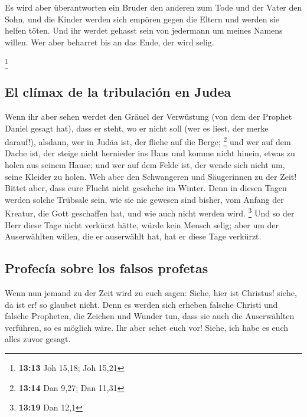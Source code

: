  Es wird aber überantworten ein Bruder den anderen zum
Tode und der Vater den Sohn, und die Kinder werden sich empören gegen
die Eltern und werden sie helfen töten.  Und ihr werdet
gehasst sein von jedermann um meines Namens willen. Wer aber beharret
bis an das Ende, der wird selig.

\footnote{\textbf{13:13} Joh 15,18; Joh 15,21}

\hypertarget{el-cluxedmax-de-la-tribulaciuxf3n-en-judea}{%
\subsection{El clímax de la tribulación en
Judea}\label{el-cluxedmax-de-la-tribulaciuxf3n-en-judea}}

 Wenn ihr aber sehen werdet den Gräuel der Verwüstung
(von dem der Prophet Daniel gesagt hat), dass er steht, wo er nicht soll
(wer es liest, der merke darauf!), alsdann, wer in Judäa ist, der fliehe
auf die Berge; \footnote{\textbf{13:14} Dan 9,27; Dan 11,31}
 und wer auf dem Dache ist, der steige nicht hernieder
ins Haus und komme nicht hinein, etwas zu holen aus seinem Hause;
 und wer auf dem Felde ist, der wende sich nicht um,
seine Kleider zu holen.  Weh aber den Schwangeren und
Säugerinnen zu der Zeit!  Bittet aber, dass eure Flucht
nicht geschehe im Winter.  Denn in diesen Tagen werden
solche Trübsale sein, wie sie nie gewesen sind bisher, vom Anfang der
Kreatur, die Gott geschaffen hat, und wie auch nicht werden wird.
\footnote{\textbf{13:19} Dan 12,1}  Und so der Herr diese
Tage nicht verkürzt hätte, würde kein Mensch selig; aber um der
Auserwählten willen, die er auserwählt hat, hat er diese Tage verkürzt.

\hypertarget{profecuxeda-sobre-los-falsos-profetas}{%
\subsection{Profecía sobre los falsos
profetas}\label{profecuxeda-sobre-los-falsos-profetas}}

 Wenn nun jemand zu der Zeit wird zu euch sagen: Siehe,
hier ist Christus! siehe, da ist er! so glaubet nicht. 
Denn es werden sich erheben falsche Christi und falsche Propheten, die
Zeichen und Wunder tun, dass sie auch die Auserwählten verführen, so es
möglich wäre.  Ihr aber sehet euch vor! Siehe, ich habe
es euch alles zuvor gesagt.

